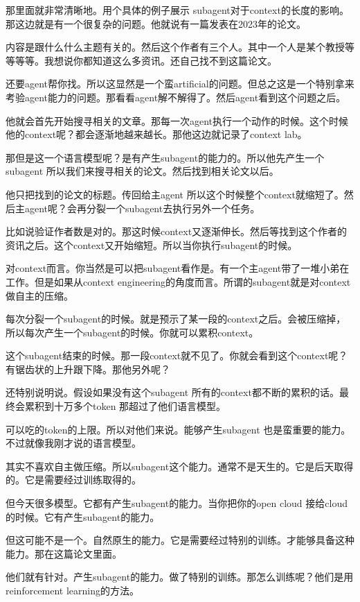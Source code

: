 \documentclass[12pt,a4paper]{article}
\begin{document}
那里面就非常清晰地。用个具体的例子展示 subagent对于context的长度的影响。那这边就是有一个很复杂的问题。他就说有一篇发表在2023年的论文。

内容是跟什么什么主题有关的。然后这个作者有三个人。其中一个人是某个教授等等等等。我想说你都知道这么多资讯。还自己找不到这篇论文。

还要agent帮你找。所以这显然是一个蛮artificial的问题。但总之这是一个特别拿来考验agent能力的问题。那看看agent解不解得了。然后agent看到这个问题之后。

他就会首先开始搜寻相关的文章。那每一次agent执行一个动作的时候。这个时候他的context呢？都会逐渐地越来越长。那他这边就记录了context lab。

那但是这一个语言模型呢？是有产生subagent的能力的。所以他先产生一个subagent 所以我们来搜寻相关的论文。然后找到相关论文以后。

他只把找到的论文的标题。传回给主agent 所以这个时候整个context就缩短了。然后主agent呢？会再分裂一个subagent去执行另外一个任务。

比如说验证作者数是对的。那这时候context又逐渐伸长。然后等找到这个作者的资讯之后。这个context又开始缩短。所以当你执行subagent的时候。

对context而言。你当然是可以把subagent看作是。有一个主agent带了一堆小弟在工作。但是如果从context engineering的角度而言。所谓的subagent就是对context做自主的压缩。

每次分裂一个subagent的时候。就是预示了某一段的context之后。会被压缩掉，所以每次产生一个subagent的时候。你就可以累积context。

这个subagent结束的时候。那一段context就不见了。你就会看到这个context呢？有锯齿状的上升跟下降。那他另外呢？

还特别说明说。假设如果没有这个subagent 所有的context都不断的累积的话。最终会累积到十万多个token 那超过了他们语言模型。

可以吃的token的上限。所以对他们来说。能够产生subagent 也是蛮重要的能力。不过就像我刚才说的语言模型。

其实不喜欢自主做压缩。所以subagent这个能力。通常不是天生的。它是后天取得的。它是需要经过训练取得的。

但今天很多模型。它都有产生subagent的能力。当你把你的open cloud 接给cloud的时候。它有产生subagent的能力。

但这可能不是一个。自然原生的能力。它是需要经过特别的训练。才能够具备这种能力。那在这篇论文里面。

他们就有针对。产生subagent的能力。做了特别的训练。那怎么训练呢？他们是用reinforcement learning的方法。
\end{document}
